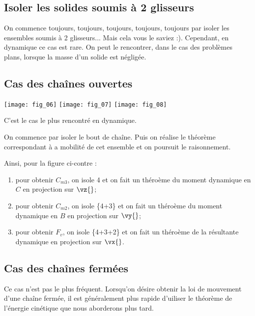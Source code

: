 \subsection{Isoler les solides soumis à 2 glisseurs}

On commence toujours, \large{toujours}, \Large{toujours}, \LARGE{toujours}, \huge{toujours} \normalsize par isoler les ensembles soumis à 2 glisseurs... Mais cela vous le saviez :). Cependant, en dynamique ce cas est rare. On peut le rencontrer, dans le cas des problèmes plans, lorsque la masse d'un solide est négligée.


\subsection{Cas des chaînes ouvertes}

\begin{marginfigure}
\texttt{[image: fig\_06]}
\texttt{[image: fig\_07]}
\texttt{[image: fig\_08]}
\end{marginfigure}

C'est le cas le plus rencontré en dynamique. 

On commence par isoler le bout de chaîne. Puis on réalise le théorème correspondant à a mobilité de cet ensemble et on poursuit le raisonnement. 



Ainsi, pour la figure ci-contre :
\begin{enumerate}
\item pour obtenir $C_{m3}$, on isole 4 et on fait un théroème du moment dynamique en $C$ en projection sur $\vz{}$;
\item pour obtenir $C_{m2}$, on isole \{4+3\} et on fait un théroème du moment dynamique en $B$ en projection sur $\vy{}$;
\item pour obtenir $F_{v}$, on isole \{4+3+2\} et on fait un théroème de la résultante dynamique en projection sur $\vx{}$.
\end{enumerate}


\subsection{Cas des chaînes fermées}

Ce cas n'est pas le plus fréquent. Lorsqu'on désire obtenir la loi de mouvement d'une chaîne fermée, il est généralement plus rapide d'uiliser le théorème de l'énergie cinétique que nous aborderons plus tard. 

